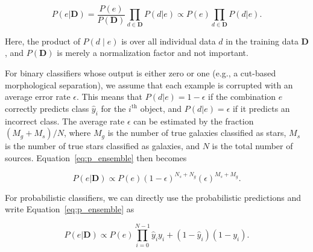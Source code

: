 \documentclass[useAMS,usenatbib]{mn2e}
\newcommand{\eg}{{e.g., }}
\begin{document}
\begin{equation}
  P \left(e | \mathbf{D} \right)
  = \frac{P \left(e \right)}{P \left(\mathbf{D} \right)}
  \prod_{d \in \mathbf{D}} P \left( d | e \right)
  \propto P \left(e\right) \prod_{d \in \mathbf{D}} P \left(d | e \right).
  \label{eq:p_ensemble}
\end{equation}

\noindent
Here, the product of $P\left(d \mid e\right)$ is
over all individual data $d$ in the training data $\mathbf{D}$,
and $P\left(\mathbf{D}\right)$ is merely a normalization factor
and not important.

For binary classifiers whose output is either zero or one
(\eg a cut-based morphological separation),
we assume that each example is corrupted with
an average error rate $\epsilon$.
This means that
$P\left(d|e\right) = 1-\epsilon$ if the combination $e$
correctly predicts class $\hat{y}_i$ for the $i^{\text{th}}$ object,
and $P\left(d|e\right) = \epsilon$ if it predicts an incorrect class.
The average rate $\epsilon$ can be estimated by
the fraction $\left(M_g + M_s\right) / N$,
where $M_g$ is the number of true galaxies classified as stars,
$M_s$ is the number of true stars classified as galaxies,
and $N$ is the total number of sources.
Equation~\ref{eq:p_ensemble} then becomes

\begin{equation}
  P \left( e | \mathbf{D} \right) \propto 
  P \left( e \right) \left(1 - \epsilon \right)^{N_s + N_g}
  \left( \epsilon \right)^{M_s + M_g}.
\end{equation}

\noindent
For probabilistic classifiers,
we can directly use the probabilistic predictions
and write Equation~\ref{eq:p_ensemble} as

\begin{equation}
  P \left( e | \mathbf{D} \right) \propto 
  P \left( e \right) \prod_{i=0}^{N-1}
  \hat{y}_i y_i + 
  \left(1 - \hat{y}_i\right) \left(1 - y_i\right).
\end{equation}


\end{document}
